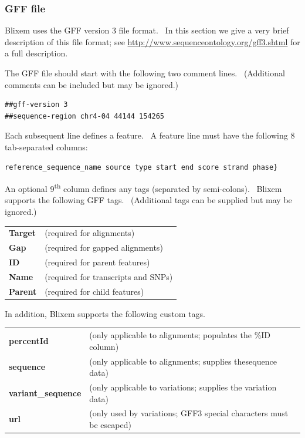 \documentclass[letterpaper]{article}
\begin{document}
{\color[rgb]{0.30980393,0.5058824,0.7411765}\subsubsection[GFF file]{GFF file}}
\hypertarget{RefHeading1521056909880}{}{
Blixem uses the GFF version 3 file format. \ In this section we give a
very brief description of this file format; see
\url{http://www.sequenceontology.org/gff3.shtml} for a full
description.}

\bigskip

{The GFF file should start with the following two comment lines.
\ (Additional comments can be included but may be ignored.)
\begin{verbatim}
##gff-version 3
##sequence-region chr4-04 44144 154265
\end{verbatim}
Each subsequent line defines a feature. \ A feature line must have the
following 8 tab-separated columns:
\begin{verbatim}
reference_sequence_name source type start end score strand phase}
\end{verbatim}
An optional 9\textsuperscript{th} column defines any tags (separated by
semi-colons). \ Blixem supports the following GFF tags. \ (Additional
tags can be supplied but may be ignored.)}
\begin{center}
\begin{supertabular}{p{2.802cm}p{10.704cm}} 
\textbf{Target } & (required for alignments) \\
\textbf{Gap}  & (required for gapped alignments) \\
\textbf{ID } & (required for parent features) \\
\textbf{Name } & (required for transcripts and SNPs) \\
\textbf{Parent } & (required for child features) \\
\end{supertabular}
\end{center}

{In addition, Blixem supports the following custom tags.}
\begin{center}
\begin{supertabular}{p{2.802cm}p{10.704cm}} 
\textbf{percentId} & (only applicable to alignments; populates the \%ID column) \\
\textbf{sequence } & (only applicable to alignments; supplies thesequence data) \\
\textbf{variant\_sequence} & (only applicable to variations; supplies the variation data) \\
\textbf{url } & (only used by variations; GFF3 special characters must be escaped) \\
\end{supertabular}
\end{center}
\end{document}
